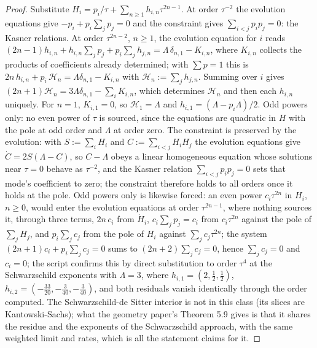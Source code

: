 \documentclass[11pt]{article}
\theoremstyle{definition}
\begin{document}
\begin{proof}
Substitute $H_i = p_i/\tau + \sum_{n\geq 1}h_{i,n}\tau^{2n-1}$. At order $\tau^{-2}$ the evolution equations give $-p_i + p_i\sum_j p_j = 0$ and the constraint gives $\sum_{i<j}p_ip_j = 0$: the Kasner relations. At order $\tau^{2n-2}$, $n \geq 1$, the evolution equation for $i$ reads $(2n-1)h_{i,n} + h_{i,n}\sum_j p_j + p_i\sum_j h_{j,n} = \Lambda\,\delta_{n,1} - K_{i,n}$, where $K_{i,n}$ collects the products of coefficients already determined; with $\sum p = 1$ this is $2n\,h_{i,n} + p_i\,\mathcal{H}_n = \Lambda\delta_{n,1} - K_{i,n}$ with $\mathcal{H}_n := \sum_j h_{j,n}$. Summing over $i$ gives $(2n+1)\mathcal{H}_n = 3\Lambda\delta_{n,1} - \sum_iK_{i,n}$, which determines $\mathcal{H}_n$ and then each $h_{i,n}$ uniquely. For $n = 1$, $K_{i,1} = 0$, so $\mathcal{H}_1 = \Lambda$ and $h_{i,1} = (\Lambda - p_i\Lambda)/2$. Odd powers only: no even power of $\tau$ is sourced, since the equations are quadratic in $H$ with the pole at odd order and $\Lambda$ at order zero. The constraint is preserved by the evolution: with $S := \sum_iH_i$ and $C := \sum_{i<j}H_iH_j$ the evolution equations give $\dot C = 2S(\Lambda - C)$, so $C - \Lambda$ obeys a linear homogeneous equation whose solutions near $\tau = 0$ behave as $\tau^{-2}$, and the Kasner relation $\sum_{i<j}p_ip_j = 0$ sets that mode's coefficient to zero; the constraint therefore holds to all orders once it holds at the pole. Odd powers only is likewise forced: an even power $c_i\tau^{2n}$ in $H_i$, $n \geq 0$, would enter the evolution equations at order $\tau^{2n-1}$, where nothing sources it, through three terms, $2n\,c_i$ from $\dot H_i$, $c_i\sum_jp_j = c_i$ from $c_i\tau^{2n}$ against the pole of $\sum_jH_j$, and $p_i\sum_jc_j$ from the pole of $H_i$ against $\sum_jc_j\tau^{2n}$; the system $(2n+1)c_i + p_i\sum_jc_j = 0$ sums to $(2n+2)\sum_jc_j = 0$, hence $\sum_jc_j = 0$ and $c_i = 0$; the script confirms this by direct substitution to order $\tau^4$ at the Schwarzschild exponents with $\Lambda = 3$, where $h_{i,1} = (2, \tfrac12, \tfrac12)$, $h_{i,2} = (-\tfrac{33}{20}, -\tfrac{3}{40}, -\tfrac{3}{40})$, and both residuals vanish identically through the order computed. The Schwarzschild-de Sitter interior is not in this class (its slices are Kantowski-Sachs); what the geometry paper's Theorem 5.9 \cite[Thm.~5.9]{ButlerT6} gives is that it shares the residue and the exponents of the Schwarzschild approach, with the same weighted limit and rates, which is all the statement claims for it.
\end{proof}
\end{document}
